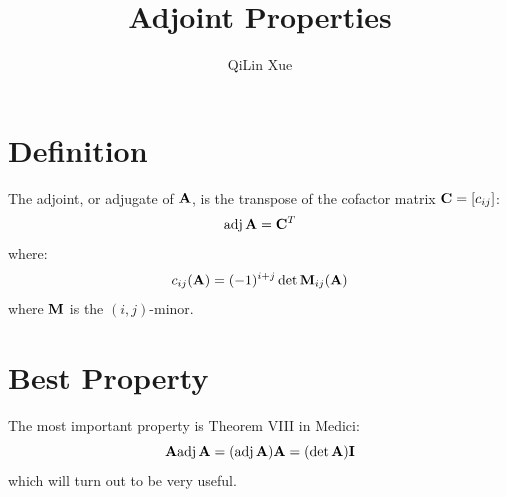 \documentclass{article}
\title{Adjoint Properties}
\author{QiLin Xue}
\begin{document}
    \maketitle
    \section{Definition}
    The adjoint, or adjugate of $\mathbf{A}$, is the transpose of the cofactor matrix $\mathbf{C}=[c_{ij}]$:
    \begin{equation*}
        \mathrm{adj}\,\mathbf{A} = \mathbf{C}^T
    \end{equation*}
    where:
    \begin{equation*}
        c_{ij}(\mathbf{A}) = (-1)^{i+j}\det \mathbf{M}_{ij}(\mathbf{A})
    \end{equation*}
    where $\mathbf{M}$ is the $(i,j)$-minor.
    \section{Best Property}
    The most important property is Theorem VIII in Medici:
    \begin{equation*}
        \mathbf{A}\mathrm{adj}\,\mathbf{A} = (\mathrm{adj}\,\mathbf{A})\mathbf{A} = (\det \mathbf{A})\mathbf{I}
    \end{equation*}
    which will turn out to be very useful.
\end{document}
